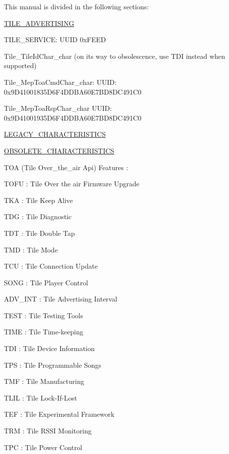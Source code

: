 This manual is divided in the following sections\+:


\begin{DoxyItemize}
\item \mbox{\hyperlink{group___t_i_l_e___a_d_v_e_r_t_i_s_i_n_g}{T\+I\+L\+E\+\_\+\+A\+D\+V\+E\+R\+T\+I\+S\+I\+NG}} ~\newline

\item T\+I\+L\+E\+\_\+\+S\+E\+R\+V\+I\+C\+E\+: U\+U\+ID 0x\+F\+E\+ED
\begin{DoxyItemize}
\item Tile\+\_\+\+Tile\+Id\+Char\+\_\+char (on its way to obsolescence, use T\+DI instead when supported)
\item Tile\+\_\+\+Mep\+Toa\+Cmd\+Char\+\_\+char\+: U\+U\+ID\+: 0x9\+D41001835\+D6\+F4\+D\+D\+B\+A60\+E7\+B\+D8\+D\+C491\+C0
\item Tile\+\_\+\+Mep\+Toa\+Rsp\+Char\+\_\+char U\+U\+ID\+: 0x9\+D41001935\+D6\+F4\+D\+D\+B\+A60\+E7\+B\+D8\+D\+C491\+C0
\item \mbox{\hyperlink{group___l_e_g_a_c_y___c_h_a_r_a_c_t_e_r_i_s_t_i_c_s}{L\+E\+G\+A\+C\+Y\+\_\+\+C\+H\+A\+R\+A\+C\+T\+E\+R\+I\+S\+T\+I\+CS}}
\item \mbox{\hyperlink{group___o_b_s_o_l_e_t_e___c_h_a_r_a_c_t_e_r_i_s_t_i_c_s}{O\+B\+S\+O\+L\+E\+T\+E\+\_\+\+C\+H\+A\+R\+A\+C\+T\+E\+R\+I\+S\+T\+I\+CS}} ~\newline

\end{DoxyItemize}
\item T\+OA (Tile Over\+\_\+the\+\_\+air Api) Features \+:
\begin{DoxyItemize}
\item T\+O\+FU \+: Tile Over the air Firmware Upgrade
\item T\+KA \+: Tile Keep Alive
\item T\+DG \+: Tile Diagnostic
\item T\+DT \+: Tile Double Tap
\item T\+MD \+: Tile Mode
\item T\+CU \+: Tile Connection Update
\item S\+O\+NG \+: Tile Player Control
\item A\+D\+V\+\_\+\+I\+NT \+: Tile Advertising Interval
\item T\+E\+ST \+: Tile Testing Tools
\item T\+I\+ME \+: Tile Time-\/keeping
\item T\+DI \+: Tile Device Information
\item T\+PS \+: Tile Programmable Songs
\item T\+MF \+: Tile Manufacturing
\item T\+L\+IL \+: Tile Lock-\/\+If-\/\+Lost
\item T\+EF \+: Tile Experimental Framework
\item T\+RM \+: Tile R\+S\+SI Monitoring
\item T\+PC \+: Tile Power Control ~\newline


\end{DoxyItemize}
\end{DoxyItemize}
